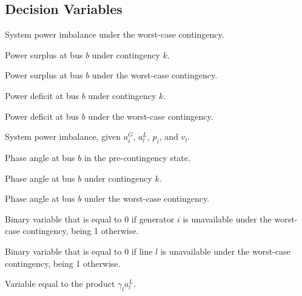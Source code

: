 \subsection{Decision Variables}
\begin{description}

\item[${{\Delta}D}^{wc}$] System power imbalance under the worst-case contingency.

\item[${\Delta{D}}^{+k}_{b}$] Power surplus at bus $b$ under contingency $k$.
\vspace{0.15cm}

\item[${\Delta{D}}^{+wc}_{b}$] Power surplus at bus $b$ under the worst-case contingency.

\item[${\Delta{D}}^{-k}_{b}$] Power deficit at bus $b$ under contingency $k$.
\vspace{0.15cm}

\item[${\Delta{D}}^{-wc}_{b}$] Power deficit at bus $b$ under the worst-case contingency.

\item[${\delta}$] System power imbalance, given ${a}^{G}_{i}$, ${a}^{L}_{l}$, ${p}_{i}$, and ${v}_{l}$.

\item[${\theta}_{b}$] Phase angle at bus $b$ in the pre-contingency state.

\item[${\theta}^{k}_{b}$] Phase angle at bus $b$ under contingency $k$.

\item[${\theta}^{wc}_{b}$] Phase angle at bus $b$ under the worst-case contingency.

\item[${a}^{G}_{i}$] Binary variable that is equal to 0 if generator $i$ is unavailable under the worst-case contingency, being 1 otherwise.

\vspace{0.1cm}
\item[${a}^{L}_{l}$] Binary variable that is equal to 0 if line $l$ is unavailable under the worst-case contingency, being 1 otherwise.

\item[${d}_{l}$] Variable equal to the product ${{\gamma}_{l}} {a}^{L}_{l}$.


\end{description}
